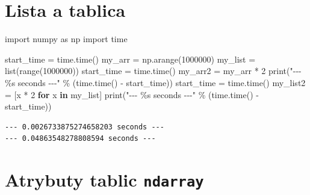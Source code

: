 \documentclass[
  polish,
  letterpaper,
  DIV=11,
  numbers=noendperiod]{scrreprt}
\newenvironment{Shaded}{\begin{snugshade}}{\end{snugshade}}
\newcommand{\BuiltInTok}[1]{\textcolor[rgb]{0.00,0.23,0.31}{#1}}
\newcommand{\ControlFlowTok}[1]{\textcolor[rgb]{0.00,0.23,0.31}{\textbf{#1}}}
\newcommand{\DecValTok}[1]{\textcolor[rgb]{0.68,0.00,0.00}{#1}}
\newcommand{\ImportTok}[1]{\textcolor[rgb]{0.00,0.46,0.62}{#1}}
\newcommand{\KeywordTok}[1]{\textcolor[rgb]{0.00,0.23,0.31}{\textbf{#1}}}
\newcommand{\NormalTok}[1]{\textcolor[rgb]{0.00,0.23,0.31}{#1}}
\newcommand{\OperatorTok}[1]{\textcolor[rgb]{0.37,0.37,0.37}{#1}}
\newcommand{\SpecialCharTok}[1]{\textcolor[rgb]{0.37,0.37,0.37}{#1}}
\newcommand{\StringTok}[1]{\textcolor[rgb]{0.13,0.47,0.30}{#1}}
\begin{document}
\chapter{Lista a tablica}\label{lista-a-tablica}

\begin{Shaded}
\begin{Highlighting}[]
\ImportTok{import}\NormalTok{ numpy }\ImportTok{as}\NormalTok{ np}
\ImportTok{import}\NormalTok{ time}

\NormalTok{start\_time }\OperatorTok{=}\NormalTok{ time.time()}
\NormalTok{my\_arr }\OperatorTok{=}\NormalTok{ np.arange(}\DecValTok{1000000}\NormalTok{)}
\NormalTok{my\_list }\OperatorTok{=} \BuiltInTok{list}\NormalTok{(}\BuiltInTok{range}\NormalTok{(}\DecValTok{1000000}\NormalTok{))}
\NormalTok{start\_time }\OperatorTok{=}\NormalTok{ time.time()}
\NormalTok{my\_arr2 }\OperatorTok{=}\NormalTok{ my\_arr }\OperatorTok{*} \DecValTok{2}
\BuiltInTok{print}\NormalTok{(}\StringTok{"{-}{-}{-} }\SpecialCharTok{\%s}\StringTok{ seconds {-}{-}{-}"} \OperatorTok{\%}\NormalTok{ (time.time() }\OperatorTok{{-}}\NormalTok{ start\_time))}
\NormalTok{start\_time }\OperatorTok{=}\NormalTok{ time.time()}
\NormalTok{my\_list2 }\OperatorTok{=}\NormalTok{ [x }\OperatorTok{*} \DecValTok{2} \ControlFlowTok{for}\NormalTok{ x }\KeywordTok{in}\NormalTok{ my\_list]}
\BuiltInTok{print}\NormalTok{(}\StringTok{"{-}{-}{-} }\SpecialCharTok{\%s}\StringTok{ seconds {-}{-}{-}"} \OperatorTok{\%}\NormalTok{ (time.time() }\OperatorTok{{-}}\NormalTok{ start\_time))}
\end{Highlighting}
\end{Shaded}

\begin{verbatim}
--- 0.0026733875274658203 seconds ---
--- 0.04863548278808594 seconds ---
\end{verbatim}

\chapter{\texorpdfstring{Atrybuty tablic
\texttt{ndarray}}{Atrybuty tablic ndarray}}\label{atrybuty-tablic-ndarray}
\end{document}
